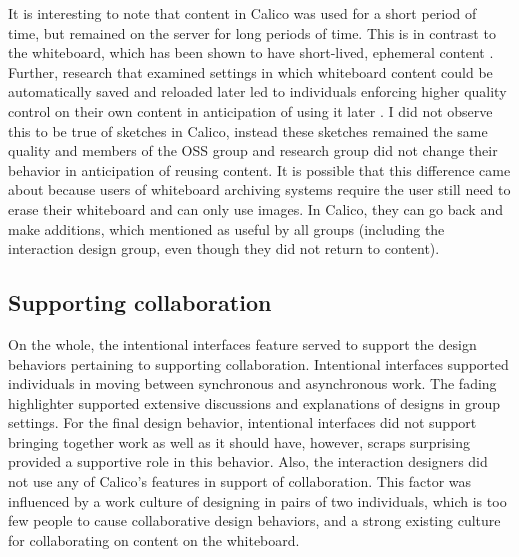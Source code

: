 \documentclass[12pt,fleqn]{ucithesis}
\begin{document}
It is interesting to note that content in Calico was used for a short period of time, but remained on the server for long periods of time. This is in contrast to the whiteboard, which has been shown to have short-lived, ephemeral content \cite{cherubini2007let}. Further, research that examined settings in which whiteboard content could be automatically saved and reloaded later led to individuals enforcing higher quality control on their own content in anticipation of using it later \cite{Branham2010fromwhiteboard}. I did not observe this to be true of sketches in Calico, instead these sketches remained the same quality and members of the OSS group and research group did not change their behavior in anticipation of reusing content. It is possible that this difference came about because users of whiteboard archiving systems require the user still need to erase their whiteboard and can only use images. In Calico, they can go back and make additions, which mentioned as useful by all groups (including the interaction design group, even though they did not return to content).





\subsection{Supporting collaboration}

On the whole, the intentional interfaces feature served to support the design behaviors pertaining to supporting collaboration. Intentional interfaces supported individuals in moving between synchronous and asynchronous work. The fading highlighter supported extensive discussions and explanations of designs in group settings. For the final design behavior, intentional interfaces did not support bringing together work as well as it should have, however, scraps surprising provided a supportive role in this behavior. Also, the interaction designers did not use any of Calico's features in support of collaboration. This factor was influenced by a work culture of designing in pairs of two individuals, which is too few people to cause collaborative design behaviors, and a strong existing culture for collaborating on content on the whiteboard.
\end{document}

